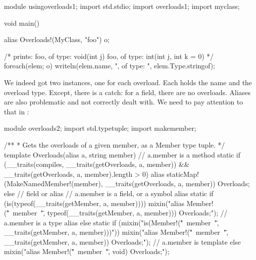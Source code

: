 
\begin{dcode}
module usingoverloads1;
import std.stdio;
import overloads1;
import myclass;

void main()
{
    alias Overloads!(MyClass, "foo") o;
    
    /* 
    prints:
    foo, of type: void(int j)
    foo, of type: int(int j, int k = 0)
    */
    foreach(elem; o) 
        writeln(elem.name, ", of type: ", elem.Type.stringof);
}
\end{dcode}

We indeed got two  instances, one for each overload. Each  holds the name  and the overload type. Except, there is a catch: for a field, there are no overloads. Aliases are also problematic and not correctly dealt with. We need to pay attention to that in :

\begin{dcode}
module overloads2;
import std.typetuple;
import makemember;

/**
 * Gets the overloads of a given member, as a Member type tuple.
 */
template Overloads(alias a, string member)
{
    // a.member is a method
    static if (__traits(compiles, __traits(getOverloads, a, member)) 
        && __traits(getOverloads, a, member).length > 0)
        alias staticMap!(MakeNamedMember!(member), __traits(getOverloads, a, member))
              Overloads;
    else // field or alias
    // a.member is a field, or a symbol alias
        static if (is(typeof(__traits(getMember, a, member))))
            mixin("alias Member!(\""~member~"\", typeof(__traits(getMember, a, member))) Overloads;");
    // a.member is a type alias
    else static if (mixin("is(Member!(\""~member~"\", __traits(getMember, a, member)))"))
        mixin("alias Member!(\""~member~"\", __traits(getMember, a, member)) Overloads;");
    // a.member is template
    else
        mixin("alias Member!(\""~member~"\", void) Overloads;");
}
\end{dcode}

